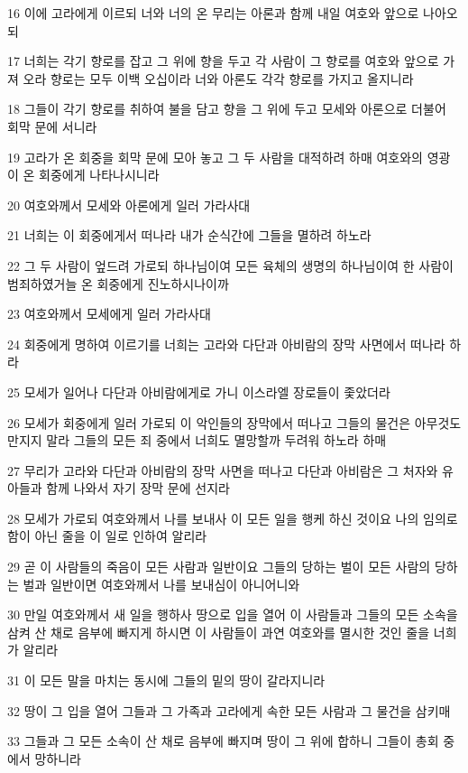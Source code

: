 \par 16 이에 고라에게 이르되 너와 너의 온 무리는 아론과 함께 내일 여호와 앞으로 나아오되
\par 17 너희는 각기 향로를 잡고 그 위에 향을 두고 각 사람이 그 향로를 여호와 앞으로 가져 오라 향로는 모두 이백 오십이라 너와 아론도 각각 향로를 가지고 올지니라
\par 18 그들이 각기 향로를 취하여 불을 담고 향을 그 위에 두고 모세와 아론으로 더불어 회막 문에 서니라
\par 19 고라가 온 회중을 회막 문에 모아 놓고 그 두 사람을 대적하려 하매 여호와의 영광이 온 회중에게 나타나시니라
\par 20 여호와께서 모세와 아론에게 일러 가라사대
\par 21 너희는 이 회중에게서 떠나라 내가 순식간에 그들을 멸하려 하노라
\par 22 그 두 사람이 엎드려 가로되 하나님이여 모든 육체의 생명의 하나님이여 한 사람이 범죄하였거늘 온 회중에게 진노하시나이까
\par 23 여호와께서 모세에게 일러 가라사대
\par 24 회중에게 명하여 이르기를 너희는 고라와 다단과 아비람의 장막 사면에서 떠나라 하라
\par 25 모세가 일어나 다단과 아비람에게로 가니 이스라엘 장로들이 좇았더라
\par 26 모세가 회중에게 일러 가로되 이 악인들의 장막에서 떠나고 그들의 물건은 아무것도 만지지 말라 그들의 모든 죄 중에서 너희도 멸망할까 두려워 하노라 하매
\par 27 무리가 고라와 다단과 아비람의 장막 사면을 떠나고 다단과 아비람은 그 처자와 유아들과 함께 나와서 자기 장막 문에 선지라
\par 28 모세가 가로되 여호와께서 나를 보내사 이 모든 일을 행케 하신 것이요 나의 임의로 함이 아닌 줄을 이 일로 인하여 알리라
\par 29 곧 이 사람들의 죽음이 모든 사람과 일반이요 그들의 당하는 벌이 모든 사람의 당하는 벌과 일반이면 여호와께서 나를 보내심이 아니어니와
\par 30 만일 여호와께서 새 일을 행하사 땅으로 입을 열어 이 사람들과 그들의 모든 소속을 삼켜 산 채로 음부에 빠지게 하시면 이 사람들이 과연 여호와를 멸시한 것인 줄을 너희가 알리라
\par 31 이 모든 말을 마치는 동시에 그들의 밑의 땅이 갈라지니라
\par 32 땅이 그 입을 열어 그들과 그 가족과 고라에게 속한 모든 사람과 그 물건을 삼키매
\par 33 그들과 그 모든 소속이 산 채로 음부에 빠지며 땅이 그 위에 합하니 그들이 총회 중에서 망하니라
